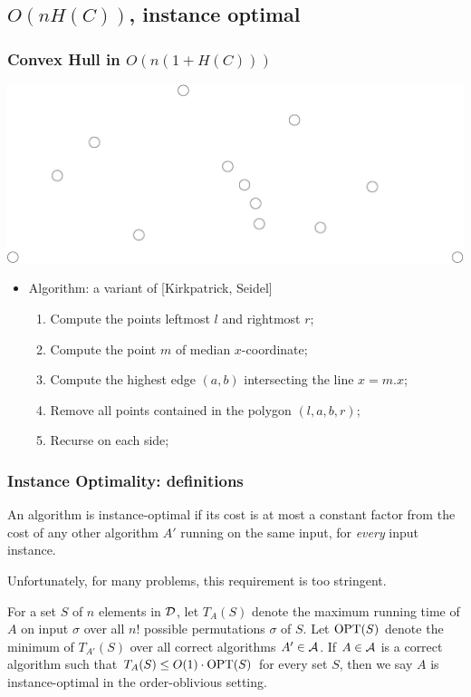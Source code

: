 \subsection{$O(n H(C))$, instance optimal}

\begin{frame}
  \frametitle{Convex Hull in $O(n(1+H(C)))$}
  \includegraphics[width=\textwidth]{points}
  \begin{itemize}
  \item Algorithm: a variant of [Kirkpatrick, Seidel]
    \begin{enumerate}
    \item Compute the points leftmost $l$ and rightmost $r$;
    \item Compute the point $m$ of median $x$-coordinate;
    \item Compute the highest edge $(a,b)$ intersecting the line $x=m.x$;
    \item Remove all points contained in the polygon $(l,a,b,r)$;
    \item Recurse on each side;
    \end{enumerate}
  \end{itemize}
\end{frame}

\begin{frame}
  \frametitle{Instance Optimality: definitions}
  
  \begin{definition}
    An algorithm is \alert{instance-optimal} if its cost is at most a
    constant factor from the cost of any other algorithm $A'$ running on
    the same input, for {\em every} input instance.
  \end{definition}
  
  Unfortunately, for many problems, this requirement is too stringent. 
  
  \begin{definition}
    For a set $S$ of $n$ elements in ${\cal D}$, let $T_A(S)$ denote
    the maximum running time of $A$ on input $\sigma$ over all $n!$
    possible permutations $\sigma$ of $S$.  Let $\mbox{\rm OPT}(S)$ denote the
    minimum of $T_{A'}(S)$ over all correct algorithms $A'\in\mathcal{A}$.  If
    $A\in\mathcal{A}$ is a correct algorithm such that $T_A(S)\le
    O(1)\cdot\mbox{\rm OPT}(S)$ for every set $S$, then we say $A$ is
    \alert{instance-optimal in the order-oblivious setting}.
  \end{definition}
\end{frame}


